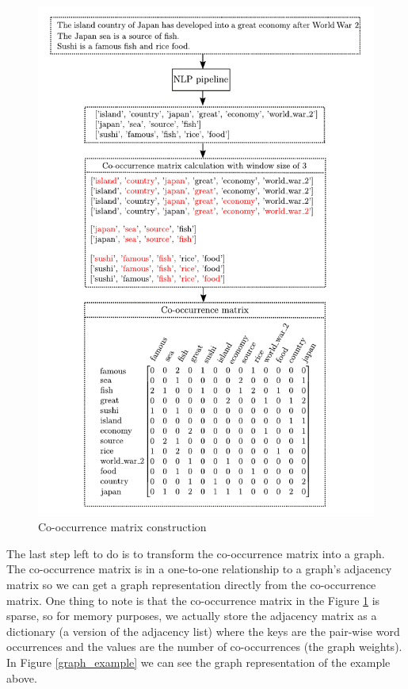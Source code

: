\documentclass[12pt]{article}
\numberwithin{equation}{section}
\begin{document}
\begin{spacing}{1.5}
	
	\begin{figure}[H]
		\vspace{-0.5cm}
		\centering
		\includegraphics[scale=0.85]{context_diagram}		
		\caption{Co-occurrence matrix construction}
		\label{co_matrix_construction}
	\end{figure}
	
	The last step left to do is to transform the co-occurrence matrix into a graph. The co-occurrence matrix is in a one-to-one relationship to a graph's adjacency matrix so we can get a graph representation directly from the co-occurrence matrix. One thing to note is that the co-occurrence matrix in the Figure \ref{co_matrix_construction} is sparse, so for memory purposes, we actually store the adjacency matrix as a dictionary (a version of the adjacency list) where the keys are the pair-wise word occurrences and the values are the number of co-occurrences (the graph weights).
	In Figure \ref{graph_example} we can see the graph representation of the example above.
	

\end{spacing}
\end{document}
